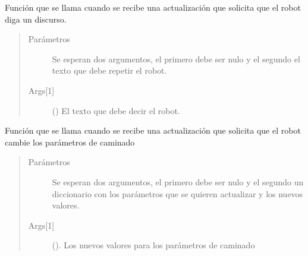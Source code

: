 
\begin{fulllineitems}
\label{\detokenize{nao_firebase:fire_nao.say}}
Función que se llama cuando se recibe una actualización que solicita
que el robot diga un discurso.
\begin{quote}\begin{description}
\item[{Parámetros}] \leavevmode
{} \textendash{} Se esperan dos argumentos, el primero debe ser nulo y el segundo el texto que debe repetir el robot.

\item[{Args{[}1{]}}] \leavevmode
() El texto que debe decir el robot.

\end{description}\end{quote}

\end{fulllineitems}


\begin{fulllineitems}
\label{\detokenize{nao_firebase:fire_nao.set_move_config}}
Función que se llama cuando se recibe una actualización que solicita
que el robot cambie los parámetros de caminado
\begin{quote}\begin{description}
\item[{Parámetros}] \leavevmode
{} \textendash{} Se esperan dos argumentos, el primero debe ser nulo y el segundo un diccionario con los parámetros que se quieren actualizar y los nuevos valores.

\item[{Args{[}1{]}}] \leavevmode
(). Los nuevos valores para los parámetros de caminado

\end{description}\end{quote}

\end{fulllineitems}

